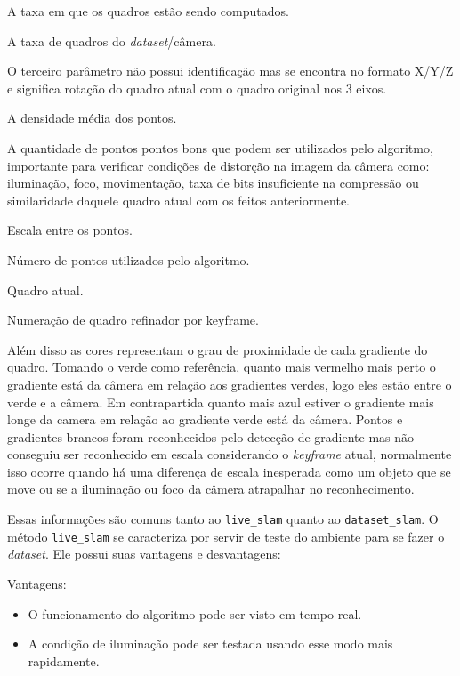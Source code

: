 \begin{description}
	\item[Map upd :]{A taxa em que os quadros estão sendo computados.}
	\item[Trk :]{A taxa de quadros do \textit{dataset}/câmera.}
	\item[X/Y/Z :]{O terceiro parâmetro não possui identificação mas se encontra no formato X/Y/Z e significa rotação do quadro atual com o quadro original nos 3 eixos.}
	\item[Dens X\% :]{A densidade média dos pontos.}
	\item[Good X\% :]{ A quantidade de pontos pontos bons que podem ser utilizados pelo algoritmo, importante para verificar condições de distorção na imagem da câmera como: iluminação, foco, movimentação, taxa de bits insuficiente na compressão ou similaridade daquele quadro atual com os feitos anteriormente.}
	\item[Scale X\% :]{Escala entre os pontos.}
	\item{Número de pontos utilizados pelo algoritmo.}
	\item{Quadro atual.}
	\item{Numeração de quadro refinador por keyframe.}
\end{description}

Além disso as cores representam o grau de proximidade de cada gradiente do quadro. Tomando o verde como referência, quanto mais vermelho mais perto o gradiente está da câmera em relação aos gradientes verdes, logo eles estão entre o verde e a câmera. Em contrapartida quanto mais azul estiver o gradiente mais longe da camera em relação ao gradiente verde está da câmera. Pontos e gradientes brancos foram reconhecidos pelo detecção de gradiente mas não conseguiu ser reconhecido em escala considerando o \textit{keyframe} atual, normalmente isso ocorre quando há uma diferença de escala inesperada como um objeto que se move ou se a iluminação ou foco da câmera atrapalhar no reconhecimento.

Essas informações são comuns tanto ao \texttt{live\_slam} quanto ao \texttt{dataset\_slam}. O método \texttt{live\_slam} se caracteriza por servir de teste do ambiente para se fazer o \textit{dataset}. Ele possui suas vantagens e desvantagens:

Vantagens:

\begin{itemize}
	\item{O funcionamento do algoritmo pode ser visto em tempo real.}
	\item{A condição de iluminação pode ser testada usando esse modo mais rapidamente.}
\end{itemize}

